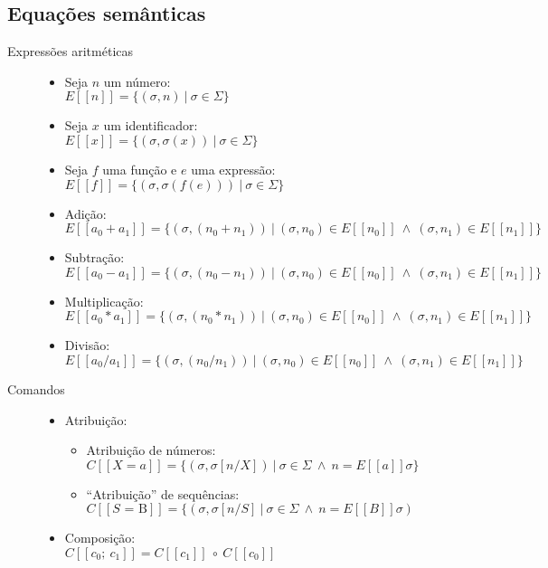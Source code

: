 \documentclass[a4 paper, 12pt]{article}
\begin{document}
\subsection{Equa\c c\~oes sem\^anticas}
\begin{description}
\item[Express\~oes aritm\'eticas]\hfill
  \begin{itemize}
  \item Seja $n$ um n\'umero:\\
    $E[[n]] = \{(\sigma, n)\ |\ \sigma \in \Sigma\}$
  \item Seja $x$ um identificador:\\
    $E[[x]] = \{(\sigma, \sigma (x))\ |\ \sigma \in \Sigma\}$
  \item Seja $f$ uma fun\c c\~ao e $e$ uma express\~ao:\\
    $E[[f]] = \{(\sigma, \sigma (f(e)))\ |\ \sigma \in \Sigma\}$
  \item Adi\c c\~ao:\\
    $E[[a_0 + a_1]] = \{(\sigma, (n_0 + n_1))\ |\ (\sigma, n_0) \in
    E[[n_0]]\ \wedge\ (\sigma, n_1) \in E[[n_1]]\}$
  \item Subtra\c c\~ao:\\
    $E[[a_0 - a_1]] = \{(\sigma, (n_0- n_1))\ |\ (\sigma, n_0) \in
    E[[n_0]]\ \wedge\ (\sigma, n_1) \in E[[n_1]]\}$
  \item Multiplica\c c\~ao:\\
    $E[[a_0 * a_1]] = \{(\sigma, (n_0 * n_1))\ |\ (\sigma, n_0) \in
    E[[n_0]]\ \wedge\ (\sigma, n_1) \in E[[n_1]]\}$
  \item Divis\~ao:\\
    $E[[a_0 / a_1]] = \{(\sigma, (n_0 / n_1))\ |\ (\sigma, n_0) \in
    E[[n_0]]\ \wedge\ (\sigma, n_1) \in E[[n_1]]\}$
  \end{itemize}
\item[Comandos]\hfill
  \begin{itemize}
  \item Atribui\c c\~ao:
    \begin{itemize}
    \item Atribui\c c\~ao de n\'umeros:\\
      $C[[X = a]] = \{(\sigma, \sigma[n / X])\ |\ \sigma \in \Sigma\
      \wedge\ n = E[[a]]\sigma\}$

    \item ``Atribui\c c\~ao'' de sequ\^encias:\\
      $C[[S \mbox{ = B}]] = \{(\sigma, \sigma[n / S]\ |\ \sigma \in \Sigma\
      \wedge\ n = E[[B]]\sigma)$
    \end{itemize}
  \item Composi\c c\~ao:\\
    $C[[c_0;\ c_1]] = C[[c_1]]\ \circ\ C[[c_0]]$
  \end{itemize}
\end{description}
\end{document}
